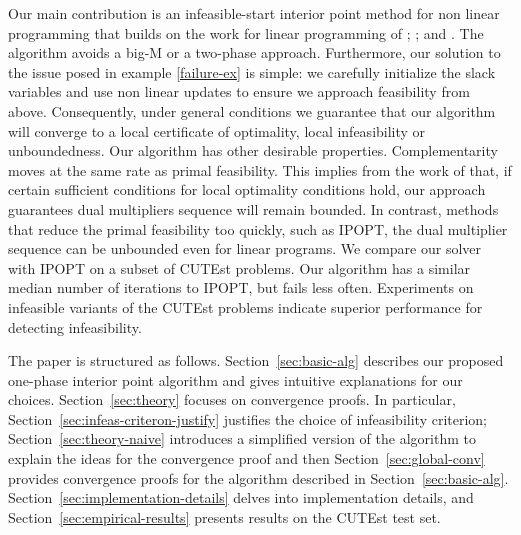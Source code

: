 \documentclass{article}
\begin{document}
Our main contribution is an infeasible-start interior point method for non linear programming that builds on the work for linear programming of \citet{lustig1990feasibility}; \citet{mehrotra1992implementation}; and \citet*{mizuno1993adaptive}. The algorithm avoids a big-M or a two-phase approach. Furthermore, our solution to the issue posed in example \eqref{failure-ex} is simple: we carefully initialize the slack variables and use non linear updates to ensure we approach feasibility from above. Consequently, under general conditions we guarantee that our algorithm will converge to a local certificate of optimality, local infeasibility or unboundedness. Our algorithm has other desirable properties. Complementarity moves at the same rate as primal feasibility. This implies from the work of \citet*{haeser2017behavior} that, if certain sufficient conditions for local optimality conditions hold, our approach guarantees dual multipliers sequence will remain bounded. In contrast, methods that reduce the primal feasibility too quickly, such as IPOPT,  the dual multiplier sequence can be unbounded even for linear programs. We compare our solver with IPOPT on a subset of CUTEst problems. Our algorithm has a similar median number of iterations to IPOPT, but fails less often. Experiments on infeasible variants of the CUTEst problems indicate superior performance for detecting infeasibility.

The paper is structured as follows. Section~\ref{sec:basic-alg} describes our proposed one-phase interior point algorithm and gives intuitive explanations for our choices. Section~\ref{sec:theory} focuses on convergence proofs. In particular, Section~\ref{sec:infeas-criteron-justify} justifies the choice of infeasibility criterion; Section~\ref{sec:theory-naive} introduces a simplified version of the algorithm to explain the ideas for the convergence proof and then Section~\ref{sec:global-conv} provides convergence proofs for the algorithm described in Section~\ref{sec:basic-alg}. Section~\ref{sec:implementation-details} delves into implementation details, and Section~\ref{sec:empirical-results} presents results on the CUTEst test set.
\end{document}
